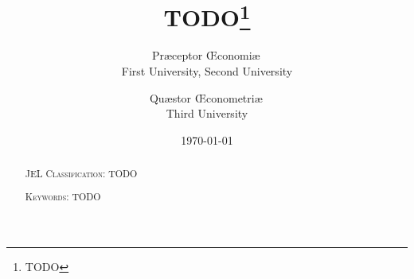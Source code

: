 \documentclass[english,a4paper,10pt]{article}
\title{TODO\thanks{TODO}} %
\author{%
  \large Præceptor Œconomiæ\,\orcidlink{0000-0002-1825-0097}\\[2pt]
  {\footnotesize First University, Second University}
  \and
  \large Quæstor Œconometriæ\,\orcidlink{0000-0002-1825-0097}\\[2pt]
  {\footnotesize Third University}
}
\date{\vspace{1em}\today} %
\theoremstyle{definition}
\begin{document}
\frenchspacing
\maketitle

\begin{abstract}
    
    \par\vspace{1em}

    \noindent\textsc{JEL Classification}: TODO\par\vspace{1em} %

    \noindent\textsc{Keywords}: TODO
\end{abstract}








\appendix


\end{document}
